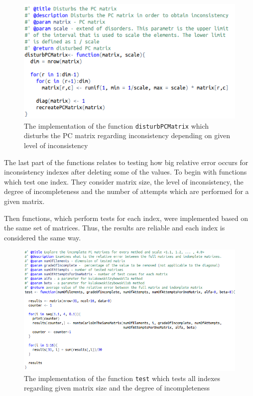 \begin{figure}[h]
\centerline{\includegraphics[scale=0.75]{images/kod12.png}}
\caption{The implementation of the function \texttt{disturbPCMatrix} which disturbs the PC matrix regarding inconsistency depending on given level of inconsistency}
\end{figure}


The last part of the functions relates to testing how big relative error occurs for inconsistency indexes after deleting some of the values. To begin with functions which test one index. They consider matrix size, the level of inconsistency, the degree of incompleteness and the number of attempts which are performed for a given matrix.

Then functions, which perform tests for each index, were implemented based on the same set of matrices. Thus, the results are reliable and each index is considered the same way.

\begin{figure}[h]
\centerline{\includegraphics[scale=0.58]{images/kod22.png}}
\caption{The implementation of the function \texttt{test} which tests all indexes regarding given matrix size and the degree of incompleteness}
\end{figure}

